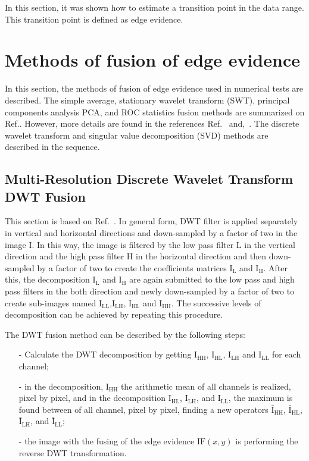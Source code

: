 \documentclass[conference]{IEEEtran}
\begin{document}
In this section, it was shown how to estimate a transition point in the data range. This transition point is defined as edge evidence. 

\section{Methods of fusion of edge evidence}\label{sec_03}

In this section, the methods of fusion of edge evidence used in numerical tests are described. The simple average, stationary wavelet transform (SWT), principal components analysis PCA, and ROC statistics fusion methods are summarized on Ref.\cite{bmf_2019}. However, more details are found in the references Ref.~\cite{n_r,mit,gs} and,~\cite{fawcett}. The discrete wavelet transform and singular value decomposition (SVD) methods are described in the sequence.

\subsection{Multi-Resolution Discrete Wavelet Transform DWT Fusion} 
This section is based on Ref.~\cite{n_r}. In general form, DWT filter is applied separately in vertical and horizontal directions and down-sampled by a factor of two in the image I. In this way, the image is filtered by the low pass filter L in the vertical direction and the high pass filter H in the horizontal direction and then down-sampled by a factor of two to create the coefficients matrices $\text{I}_\text{L}$ and $\text{I}_\text{H}$. After this, the decomposition $\text{I}_\text{L}$ and $\text{I}_\text{H}$ are again submitted to the low pass and high pass filters in the both direction and newly down-sampled by a factor of two to create sub-images named $\text{I}_\text{LL}$,$\text{I}_\text{LH}$, $\text{I}_\text{HL}$ and $\text{I}_\text{HH}$. The successive levels of decomposition can be achieved by repeating this procedure.

The DWT fusion method can be described by the following steps:
\begin{itemize}
\item[-] Calculate the DWT decomposition by getting $\text{I}_\text{HH}$, $\text{I}_\text{HL}$, $\text{I}_\text{LH}$ and $\text{I}_\text{LL}$ for each channel;
\item[-] in the decomposition, $\text{I}_\text{HH}$ the arithmetic mean of all channels is realized, pixel by pixel, and in the decomposition $\text{I}_\text{HL}$, $\text{I}_\text{LH}$, and $\text{I}_\text{LL}$, the maximum is found between of all channel, pixel by pixel, finding a new operators $\bar{\text{I}}_\text{HH}$, $\bar{\text{I}}_\text{HL}$, $\bar{\text{I}}_\text{LH}$, and $\bar{\text{I}}_\text{LL}$;
\item[-] the image with the fusing of the edge evidence $\text{IF}(x,y)$ is performing the reverse DWT transformation.  
\end{itemize}
\end{document}
